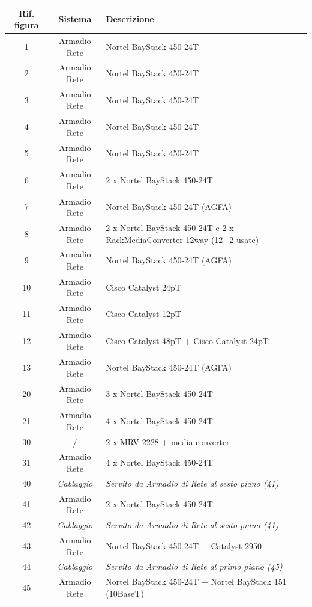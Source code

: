 \documentclass[12pt, a4paper, titlepage]{report}
\begin{document}
		\begin{longtable}{| c | c | p{6cm} |}
				\hline
				\textbf{Rif. figura} & \textbf{Sistema} & \textbf{Descrizione} \\ \hline
		1 & Armadio Rete & Nortel BayStack 450-24T \\ \hline
		2 & Armadio Rete & Nortel BayStack 450-24T \\ \hline
		3 & Armadio Rete & Nortel BayStack 450-24T \\ \hline
		4 & Armadio Rete & Nortel BayStack 450-24T \\ \hline
		5 & Armadio Rete & Nortel BayStack 450-24T \\ \hline
		6 & Armadio Rete & 2 x Nortel BayStack 450-24T \\ \hline
		7 & Armadio Rete & Nortel BayStack 450-24T (AGFA) \\ \hline
		8 & Armadio Rete & 2 x Nortel BayStack 450-24T e 2 x RackMediaConverter 12way (12+2 usate) \\ \hline
		9 & Armadio Rete & Nortel BayStack 450-24T (AGFA)\\ \hline
		10 & Armadio Rete & Cisco Catalyst 24pT \\ \hline
		11 & Armadio Rete & Cisco Catalyst 12pT \\ \hline
		12 & Armadio Rete & Cisco Catalyst 48pT + Cisco Catalyst 24pT \\ \hline
		13 & Armadio Rete & Nortel BayStack 450-24T (AGFA)\\ \hline
		20 & Armadio Rete & 3 x Nortel BayStack 450-24T \\ \hline
		21 & Armadio Rete & 4 x Nortel BayStack 450-24T \\ \hline
		30 & / & 2 x MRV 2228 + media converter \\ \hline
		31 & Armadio Rete & 4 x Nortel BayStack 450-24T \\ \hline
		40 & \textit{Cablaggio} & \textit{Servito da Armadio di Rete al sesto piano (41)} \\ \hline
		41 & Armadio Rete & 2 x Nortel BayStack 450-24T \\ \hline
		42 & \textit{Cablaggio} & \textit{Servito da Armadio di Rete al sesto piano (41)} \\ \hline
		43 & Armadio Rete & Nortel BayStack 450-24T + Catalyst 2950 \\ \hline
		44 & \textit{Cablaggio} & \textit{Servito da Armadio di Rete al primo piano (45)} \\ \hline
		45 & Armadio Rete & Nortel BayStack 450-24T + Nortel BayStack 151 (10BaseT) \\ \hline

\end{longtable}
\end{document}
